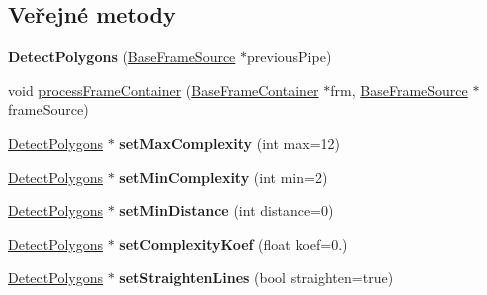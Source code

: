 \subsection*{Veřejné metody}
\begin{DoxyCompactItemize}
\item 
\hypertarget{class_ar_pipe_1_1_detect_polygons_a132ddfcdd899cede29f93097b481e57e}{{\bfseries Detect\-Polygons} (\hyperlink{class_ar_pipe_1_1_base_frame_source}{Base\-Frame\-Source} $\ast$previous\-Pipe)}\label{da/d76/class_ar_pipe_1_1_detect_polygons_a132ddfcdd899cede29f93097b481e57e}

\item 
void \hyperlink{class_ar_pipe_1_1_detect_polygons_aac72d1077fe05672a2f6f2a33b960719}{process\-Frame\-Container} (\hyperlink{class_ar_pipe_1_1_base_frame_container}{Base\-Frame\-Container} $\ast$frm, \hyperlink{class_ar_pipe_1_1_base_frame_source}{Base\-Frame\-Source} $\ast$frame\-Source)
\item 
\hypertarget{class_ar_pipe_1_1_detect_polygons_a69ab6fede463ea15454feec13cdb56d4}{\hyperlink{class_ar_pipe_1_1_detect_polygons}{Detect\-Polygons} $\ast$ {\bfseries set\-Max\-Complexity} (int max=12)}\label{da/d76/class_ar_pipe_1_1_detect_polygons_a69ab6fede463ea15454feec13cdb56d4}

\item 
\hypertarget{class_ar_pipe_1_1_detect_polygons_a3d637f0ef505dd2b6aaf19e8477fd197}{\hyperlink{class_ar_pipe_1_1_detect_polygons}{Detect\-Polygons} $\ast$ {\bfseries set\-Min\-Complexity} (int min=2)}\label{da/d76/class_ar_pipe_1_1_detect_polygons_a3d637f0ef505dd2b6aaf19e8477fd197}

\item 
\hypertarget{class_ar_pipe_1_1_detect_polygons_af9d6a11e2cbd9dfbc003c87e25e425bc}{\hyperlink{class_ar_pipe_1_1_detect_polygons}{Detect\-Polygons} $\ast$ {\bfseries set\-Min\-Distance} (int distance=0)}\label{da/d76/class_ar_pipe_1_1_detect_polygons_af9d6a11e2cbd9dfbc003c87e25e425bc}

\item 
\hypertarget{class_ar_pipe_1_1_detect_polygons_ac7c8e88f1f23987bd138555475cb158e}{\hyperlink{class_ar_pipe_1_1_detect_polygons}{Detect\-Polygons} $\ast$ {\bfseries set\-Complexity\-Koef} (float koef=0.)}\label{da/d76/class_ar_pipe_1_1_detect_polygons_ac7c8e88f1f23987bd138555475cb158e}

\item 
\hypertarget{class_ar_pipe_1_1_detect_polygons_a891e5579b3c0e500e1daad42501394ad}{\hyperlink{class_ar_pipe_1_1_detect_polygons}{Detect\-Polygons} $\ast$ {\bfseries set\-Straighten\-Lines} (bool straighten=true)}\label{da/d76/class_ar_pipe_1_1_detect_polygons_a891e5579b3c0e500e1daad42501394ad}


\end{DoxyCompactItemize}
